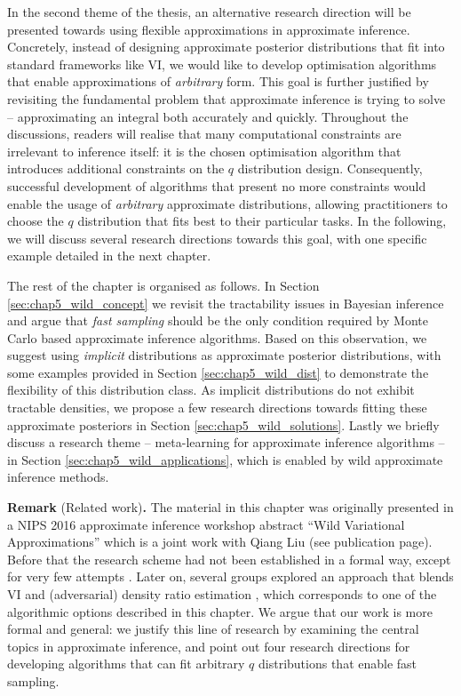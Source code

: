 In the second theme of the thesis, an alternative research direction will be presented towards using flexible approximations in approximate inference. Concretely, instead of designing approximate posterior distributions that fit into standard frameworks like VI, we would like to develop optimisation algorithms that enable approximations of \emph{arbitrary} form. This goal is further justified by revisiting the fundamental problem that approximate inference is trying to solve -- approximating an integral both accurately and quickly. Throughout the discussions, readers will realise that many computational constraints are irrelevant to inference itself: it is the chosen optimisation algorithm that introduces additional constraints on the $q$ distribution design. Consequently, successful development of algorithms that present no more constraints would enable the usage of \emph{arbitrary} approximate distributions, allowing practitioners to choose the $q$ distribution that fits best to their particular tasks. 
%
In the following, we will discuss several research directions towards this goal, with one specific example detailed in the next chapter. 

The rest of the chapter is organised as follows. In Section \ref{sec:chap5_wild_concept} we revisit the tractability issues in Bayesian inference and argue that \emph{fast sampling} should be the only condition required by Monte Carlo based approximate inference algorithms. Based on this observation, we suggest using \emph{implicit} distributions as approximate posterior distributions, with some examples provided in Section \ref{sec:chap5_wild_dist} to demonstrate the flexibility of this distribution class. As implicit distributions do not exhibit tractable densities, we propose a few research directions towards fitting these approximate posteriors in Section \ref{sec:chap5_wild_solutions}. Lastly we briefly discuss a research theme -- meta-learning for approximate inference algorithms -- in Section \ref{sec:chap5_wild_applications}, which is enabled by wild approximate inference methods.

\vspace{1em}
\begin{tcolorbox}
\textbf{Remark} (Related work)\textbf{.}
The material in this chapter was originally presented in a NIPS 2016 approximate inference workshop abstract ``Wild Variational Approximations'' which is a joint work with Qiang Liu \citep{li:wild2016} (see publication page). Before that the research scheme had not been established in a formal way, except for very few attempts \citep{ranganath:ovi2016, wang:amortisedsvgd2016}. Later on, several groups explored an approach that blends VI and (adversarial) density ratio estimation \citep{huszar:implicit2017, tran:implicit2017, mescheder:avb2017, karaletsos:adversarial_mp2016, shi:kivi2018}, which corresponds to one of the algorithmic options described in this chapter. We argue that our work is more formal and general: we justify this line of research by examining the central topics in approximate inference, and point out four research directions for developing algorithms that can fit arbitrary $q$ distributions that enable fast sampling.
\end{tcolorbox}









